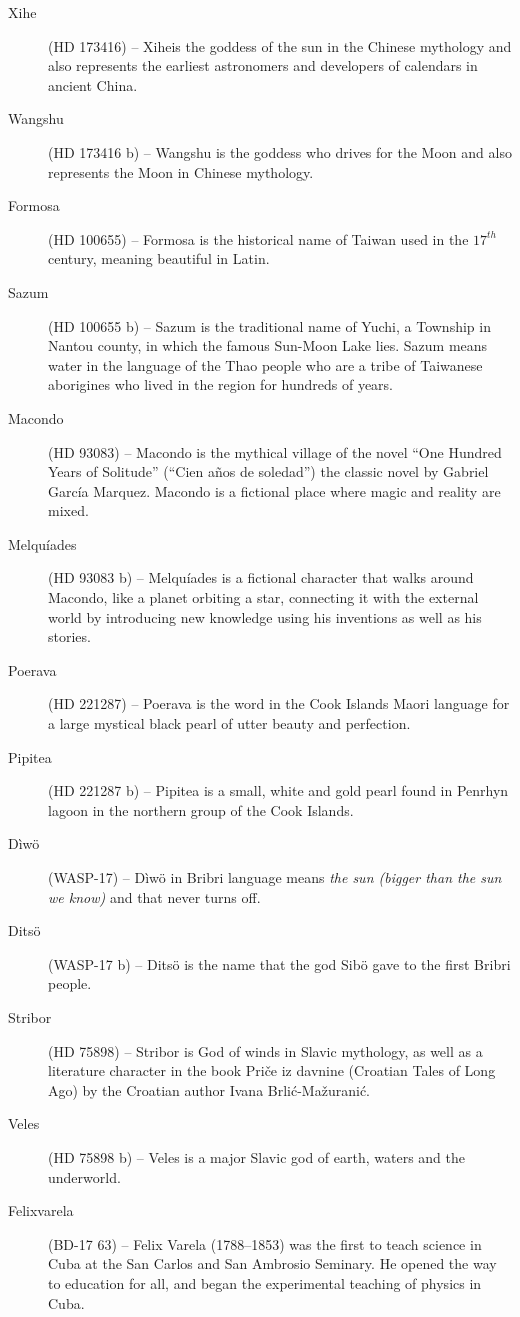 \begin{description}
\item[Xihe] (HD 173416) -- Xiheis the goddess of the sun in the Chinese mythology and also represents the earliest astronomers and developers of calendars in ancient China.
\item[Wangshu] (HD 173416 b) -- Wangshu is the goddess who drives for the Moon and also represents the Moon in Chinese mythology.
\item[Formosa] (HD 100655) -- Formosa is the historical name of Taiwan used in the $17^{th}$ century, meaning beautiful in Latin.
\item[Sazum] (HD 100655 b) -- Sazum is the traditional name of Yuchi, a Township in Nantou county, in which the famous Sun-Moon Lake lies. Sazum means water in the language of the Thao people who are a tribe of Taiwanese aborigines who lived in the region for hundreds of years.
\item[Macondo] (HD 93083) -- Macondo is the mythical village of the novel ``One Hundred Years of Solitude'' (``Cien años de soledad'') the classic novel by Gabriel García Marquez. Macondo is a fictional place where magic and reality are mixed.
\item[Melquíades] (HD 93083 b) -- Melquíades is a fictional character that walks around Macondo, like a planet orbiting a star, connecting it with the external world by introducing new knowledge using his inventions as well as his stories.
\item[Poerava] (HD 221287) -- Poerava is the word in the Cook Islands Maori language for a large mystical black pearl of utter beauty and perfection.
\item[Pipitea] (HD 221287 b) -- Pipitea is a small, white and gold pearl found in Penrhyn lagoon in the northern group of the Cook Islands.
\item[Dìwö] (WASP-17) -- Dìwö in Bribri language means \textit{the sun (bigger than the sun we know)} and that never turns off.
\item[Ditsö] (WASP-17 b) -- Ditsö is the name that the god Sibö gave to the first Bribri people.
\item[Stribor] (HD 75898) -- Stribor is God of winds in Slavic mythology, as well as a literature character in the book Priče iz davnine (Croatian Tales of Long Ago) by the Croatian author Ivana Brlić-Mažuranić.
\item[Veles] (HD 75898 b) -- Veles is a major Slavic god of earth, waters and the underworld.
\item[Felixvarela] (BD-17 63) -- Felix Varela (1788–1853) was the first to teach science in Cuba at the San Carlos and San Ambrosio Seminary. He opened the way to education for all, and began the experimental teaching of physics in Cuba.

\end{description}
